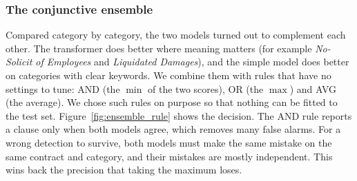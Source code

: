 \subsubsection{The conjunctive ensemble}
Compared category by category, the two models turned out to complement each other. The transformer does better where meaning matters (for example \emph{No-Solicit of Employees} and \emph{Liquidated Damages}), and the simple model does better on categories with clear keywords. We combine them with rules that have no settings to tune: AND (the $\min$ of the two scores), OR (the $\max$) and AVG (the average). We chose such rules on purpose so that nothing can be fitted to the test set. Figure~\ref{fig:ensemble_rule} shows the decision. The AND rule reports a clause only when both models agree, which removes many false alarms. For a wrong detection to survive, both models must make the same mistake on the same contract and category, and their mistakes are mostly independent. This wins back the precision that taking the maximum loses.

